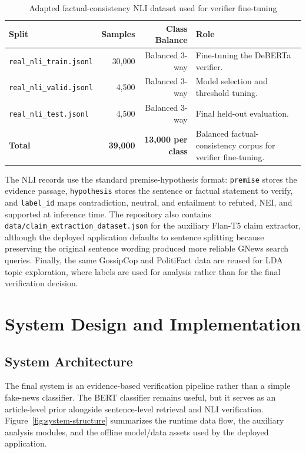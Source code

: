 \documentclass[11pt]{article}
\newcommand{\code}[1]{\texttt{#1}}
\begin{document}
\begin{table}[H]
    \centering
    \caption{Adapted factual-consistency NLI dataset used for verifier fine-tuning}
    \label{tab:nli-data}
    \begin{tabularx}{\textwidth}{@{}lrrY@{}}
        \toprule
        \textbf{Split} & \textbf{Samples} & \textbf{Class Balance} & \textbf{Role} \\
        \midrule
        \code{real\_nli\_train.jsonl} & 30,000 & Balanced 3-way & Fine-tuning the DeBERTa verifier. \\
        \code{real\_nli\_valid.jsonl} & 4,500 & Balanced 3-way & Model selection and threshold tuning. \\
        \code{real\_nli\_test.jsonl} & 4,500 & Balanced 3-way & Final held-out evaluation. \\
        \midrule
        \textbf{Total} & \textbf{39,000} & \textbf{13,000 per class} & Balanced factual-consistency corpus for verifier fine-tuning. \\
        \bottomrule
    \end{tabularx}
\end{table}

The NLI records use the standard premise-hypothesis format: \code{premise}
stores the evidence passage, \code{hypothesis} stores the sentence or factual
statement to verify, and \code{label\_id} maps contradiction, neutral, and
entailment to refuted, NEI, and supported at inference time. The repository also
contains \code{data/claim\_extraction\_dataset.json} for the auxiliary Flan-T5
claim extractor, although the deployed application defaults to sentence
splitting because preserving the original sentence wording produced more
reliable GNews search queries. Finally, the same GossipCop and PolitiFact data
are reused for LDA topic exploration, where labels are used for analysis rather
than for the final verification decision.

\section{System Design and Implementation}

\subsection{System Architecture}

The final system is an evidence-based verification pipeline rather than a
simple fake-news classifier. The BERT classifier remains useful, but it serves
as an article-level prior alongside sentence-level retrieval and NLI
verification. Figure~\ref{fig:system-structure} summarizes the runtime data
flow, the auxiliary analysis modules, and the offline model/data assets used by
the deployed application.
\end{document}
